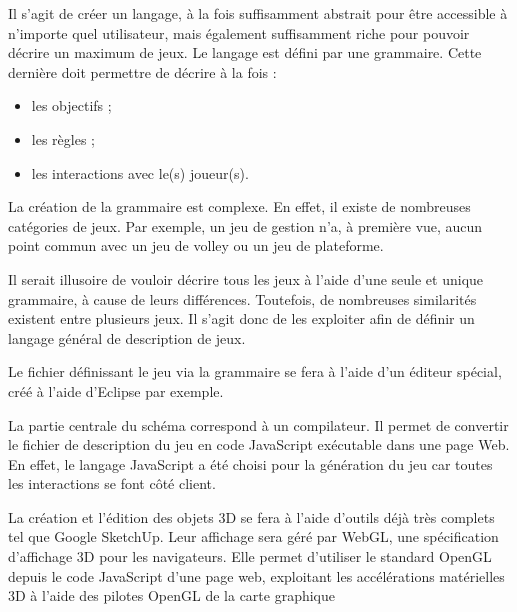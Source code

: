 \vspace{0.5cm}

Il s'agit de créer un langage, à la fois suffisamment abstrait pour être accessible à n'importe quel utilisateur, mais également suffisamment riche
pour pouvoir décrire un maximum de jeux.
Le langage est défini par une grammaire.
Cette dernière doit permettre de décrire à la fois :
\begin{itemize}
 \item les objectifs ;
 \item les règles ;
 \item les interactions avec le(s) joueur(s).
\end{itemize}

\vspace{0.5cm}

La création de la grammaire est complexe. En effet, il existe de nombreuses catégories de jeux.
Par exemple, un jeu de gestion n'a, à première vue, aucun point commun avec un jeu de volley ou un jeu de plateforme.

\vspace{0.5cm}

Il serait illusoire de vouloir décrire tous les jeux à l'aide d'une seule et unique grammaire, à cause de leurs différences.
Toutefois, de nombreuses similarités existent entre plusieurs jeux. Il s'agit donc de les exploiter afin de définir un langage général de description de jeux.

\vspace{0.5cm}

Le fichier définissant le jeu via la grammaire se fera à l'aide d'un éditeur spécial, créé à l'aide d'Eclipse par exemple.

\vspace{0.5cm}

La partie centrale du schéma correspond à un compilateur.
Il permet de convertir le fichier de description du jeu en code JavaScript exécutable dans une page Web.
En effet, le langage JavaScript a été choisi pour la génération du jeu car toutes les interactions se font côté client.

\vspace{0.5cm}

La création et l'édition des objets 3D se fera à l'aide d'outils déjà très complets tel que Google SketchUp.
Leur affichage sera géré par WebGL, une spécification d'affichage 3D pour les navigateurs. 
Elle permet d'utiliser le standard OpenGL depuis le code JavaScript d'une page web, 
exploitant les accélérations matérielles 3D à l'aide des pilotes OpenGL de la carte graphique